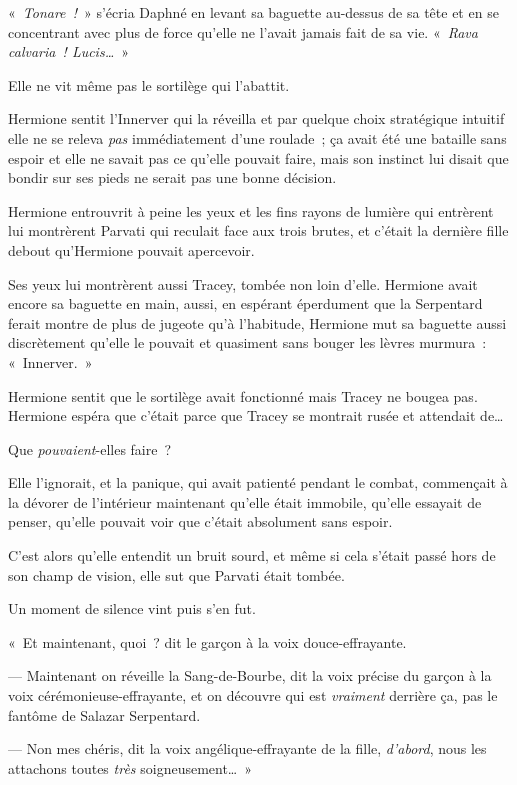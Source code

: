 «~\emph{Tonare~!}~» s'écria Daphné en levant sa baguette au-dessus de sa tête et en se concentrant avec plus de force qu'elle ne l'avait jamais fait de sa vie.
«~\emph{Rava calvaria~!
Lucis…}~»

Elle ne vit même pas le sortilège qui l'abattit.

\later

Hermione sentit l'Innerver qui la réveilla et par quelque choix stratégique intuitif elle ne se releva \emph{pas} immédiatement d'une roulade~; ça avait été une bataille sans espoir et elle ne savait pas ce qu'elle pouvait faire, mais son instinct lui disait que bondir sur ses pieds ne serait pas une bonne décision.

Hermione entrouvrit à peine les yeux et les fins rayons de lumière qui entrèrent lui montrèrent Parvati qui reculait face aux trois brutes, et c'était la dernière fille debout qu'Hermione pouvait apercevoir.

Ses yeux lui montrèrent aussi Tracey, tombée non loin d'elle.
Hermione avait encore sa baguette en main, aussi, en espérant éperdument que la Serpentard ferait montre de plus de jugeote qu'à l'habitude, Hermione mut sa baguette aussi discrètement qu'elle le pouvait et quasiment sans bouger les lèvres murmura~: «~Innerver.~»

Hermione sentit que le sortilège avait fonctionné mais Tracey ne bougea pas.
Hermione espéra que c'était parce que Tracey se montrait rusée et attendait de…

Que \emph{pouvaient}-elles faire~?

Elle l'ignorait, et la panique, qui avait patienté pendant le combat, commençait à la dévorer de l'intérieur maintenant qu'elle était immobile, qu'elle essayait de penser, qu'elle pouvait voir que c'était absolument sans espoir.

C'est alors qu'elle entendit un bruit sourd, et même si cela s'était passé hors de son champ de vision, elle sut que Parvati était tombée.

Un moment de silence vint puis s'en fut.

«~Et maintenant, quoi~? dit le garçon à la voix douce-effrayante.

--- Maintenant on réveille la Sang-de-Bourbe, dit la voix précise du garçon à la voix cérémonieuse-effrayante, et on découvre qui est \emph{vraiment} derrière ça, pas le fantôme de Salazar Serpentard.

--- Non mes chéris, dit la voix angélique-effrayante de la fille, \emph{d'abord}, nous les attachons toutes \emph{très} soigneusement…~»

